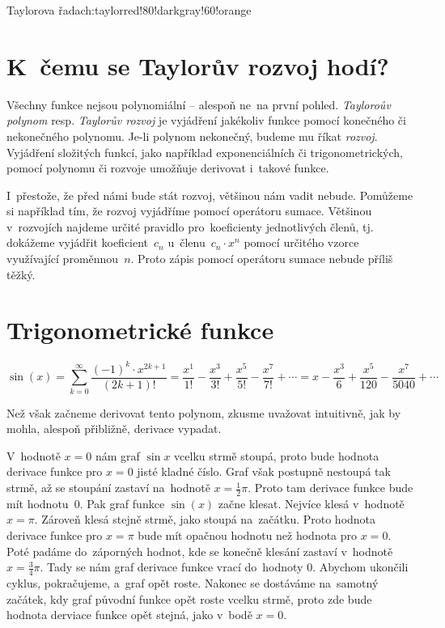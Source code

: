 \begin{chapterintro}{Taylorova řada}{ch:taylor}{red!80!darkgray!60!orange}{}
\end{chapterintro}

\section{K~čemu se Taylorův rozvoj hodí?}
\label{sec:taylor-uvod}

Všechny funkce nejsou polynomiální -- alespoň ne~na první pohled. \emph{Tayloroův
polynom} resp. \emph{Taylorův rozvoj} je vyjádření jakékoliv funkce pomocí konečného
či nekonečného polynomu. Je-li polynom nekonečný, budeme mu říkat \emph{rozvoj}.
Vyjádření složitých funkcí, jako například exponenciálních či trigonometrických,
pomocí polynomu či rozvoje umožňuje derivovat i~takové funkce.

I~přestože, že před námi bude stát rozvoj, většinou nám vadit nebude. Pomůžeme si
například tím, že rozvoj vyjádříme pomocí operátoru sumace. Většinou v~rozvojích
najdeme určité pravidlo pro~koeficienty jednotlivých členů, tj. dokážeme vyjádřit
koeficient~$c_n$ u~členu~${c_n \cdot x^n}$ pomocí určitého vzorce využívající
proměnnou~$n$. Proto zápis pomocí operátoru sumace nebude příliš těžký.

\section{Trigonometrické funkce}
\label{sec:taylor-trigonometrie}

\begin{equation*}
    \sin(x)
    = \sum_{k=0}^{\infty} \frac{(-1)^k \cdot x^{2k + 1}}{(2k + 1)!}
    = \frac{x^1}{1!} - \frac{x^3}{3!} + \frac{x^5}{5!} - \frac{x^7}{7!} + \cdots
    = x - \frac{x^3}{6} + \frac{x^5}{120} - \frac{x^7}{5040} + \cdots
\end{equation*}

Než však začneme derivovat tento polynom, zkusme uvažovat intuitivně, jak by mohla, alespoň přibližně, derivace vypadat.

V~hodnotě $x = 0$ nám graf $\sin x$ vcelku strmě stoupá, proto bude hodnota derivace funkce pro $x = 0$ jisté kladné číslo. Graf však postupně nestoupá tak strmě, až se stoupání zastaví na~hodnotě $x = \frac12 \pi$. Proto tam derivace funkce bude mít hodnotu~0. Pak graf funkce $\sin(x)$ začne klesat. Nejvíce klesá v~hodnotě $x = \pi$. Zároveň klesá stejně strmě, jako stoupá na~začátku. Proto hodnota derivace funkce pro $x = \pi$ bude mít opačnou hodnotu než hodnota pro $x = 0$. Poté padáme do~záporných hodnot, kde se konečně klesání zastaví v~hodnotě $x = \frac34 \pi$. Tady se nám graf derivace funkce vrací do~hodnoty 0. Abychom ukončili cyklus, pokračujeme, a~graf opět roste. Nakonec se dostáváme na~samotný začátek, kdy graf původní funkce opět roste vcelku strmě, proto zde bude hodnota derviace funkce opět stejná, jako v~bodě $x = 0$.

